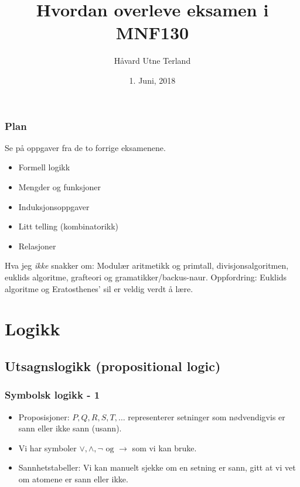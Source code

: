 \documentclass{beamer}
\title[Hvordan overleve eksamen i MNF130]{Hvordan overleve eksamen i MNF130}
\author{Håvard Utne Terland}
\institute[UiB]
{
	Universitetet i Bergen \\
	\medskip
\textit{Havard.Terland@student.uib.no}

}
\date{1. Juni, 2018}
\begin{document}
\begin{frame}
	\titlepage
\end{frame}


\begin{frame}
	\frametitle{Plan}
	Se på oppgaver fra de to forrige eksamenene.
	\begin{itemize}
		\item Formell logikk
		\item Mengder og funksjoner
		\item Induksjonsoppgaver
		\item Litt telling (kombinatorikk)
		\item Relasjoner
	\end{itemize}

	Hva jeg \textit{ikke} snakker om: Modulær aritmetikk og primtall, divisjonsalgoritmen, euklids algoritme, grafteori og gramatikker/backus-naur. Oppfordring:  Euklids algoritme og Eratosthenes' sil er veldig verdt å lære.
	
\end{frame}


\section{Logikk}

\subsection{Utsagnslogikk (propositional logic)}

\begin{frame}
	\frametitle{Symbolsk logikk - 1}
	\begin{itemize}
		\item Proposisjoner: $P,Q,R,S,T,\dots$ representerer setninger som nødvendigvis er sann eller ikke sann (usann).
		\item Vi har symboler $\vee,\wedge,\neg \text{ og } \rightarrow$ som vi kan bruke.
		\item Sannhetstabeller: Vi kan manuelt sjekke om en setning er sann, gitt at vi vet om atomene er sann eller ikke.
		 
	\end{itemize}


\end{frame}
\end{document}
